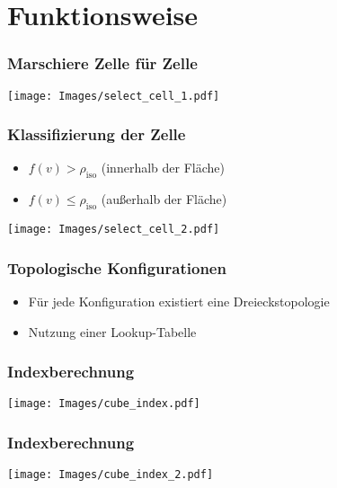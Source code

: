 \documentclass{beamer}
\begin{document}
\section{Funktionsweise}
\begin{frame}[t]
  \frametitle{Marschiere Zelle für Zelle}
  \vspace{0.8cm}
  \hspace*{-0.8cm}\texttt{[image: Images/select\_cell\_1.pdf]}
\end{frame}

\begin{frame}[t]
  \frametitle{Klassifizierung der Zelle}
  \begin{itemize}
  \item \( f(v) > \rho_{\text{iso}} \) (innerhalb der Fläche)
  \item \( f(v) \leq \rho_{\text{iso}} \) (außerhalb der Fläche)
  \end{itemize}
  \hspace*{-0.8cm}\texttt{[image: Images/select\_cell\_2.pdf]}
\end{frame}

\begin{frame}[t]
  \frametitle{Topologische Konfigurationen}
  \begin{center}
  \end{center}
  \begin{itemize}
    \item Für jede Konfiguration existiert eine Dreieckstopologie
    \item Nutzung einer Lookup-Tabelle
  \end{itemize}
\end{frame}

\begin{frame}[t]
  \frametitle{Indexberechnung}
  \begin{center}
  \vspace{-0.5cm}
  \texttt{[image: Images/cube\_index.pdf]}
  \end{center}
\end{frame}

\begin{frame}[t]
  \frametitle{Indexberechnung}
  \begin{center}
  \vspace{-0.5cm}
  \texttt{[image: Images/cube\_index\_2.pdf]}
  \end{center}
\end{frame}
\end{document}
